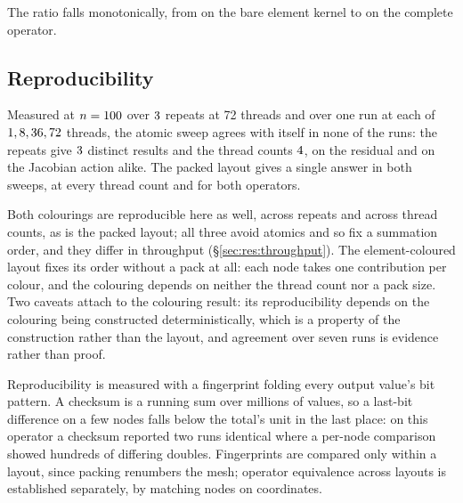 \documentclass[sigconf,nonacm]{acmart}
\newcommand{\fostag}{\emph{First-order upwind.}}
\newcommand{\provwarn}{\ifnum\campProvisional=1 \textbf{[PROVISIONAL: pipeline-validation data from \campHost, not this paper's campaign]} \fi}
\begin{document}
\begin{table}[t]
  \centering
  \caption{\provwarn \fostag{} Throughput as solver terms are added, residual at $n=\campN$, on
    the three matrix-free layouts. \emph{col.} uses element colouring with plain nodal
    additions; \emph{standard} uses atomic additions. Colouring also changes traversal
    and adds barriers, so the ratios compare implementations without isolating the
    cost of atomic updates. \texttt{f32}: the same driver with every field and kernel
    in single precision, measured in a separate allocation, so ratios are read within a group.}
  \label{tab:ladder}
  
\end{table}

The ratio falls monotonically, from \ladderBare{} on the bare element kernel to
\ladderFull{} on the complete operator.

\subsection{Reproducibility}
\label{sec:res:determinism}

Measured at $n=100$ over $3$ repeats at 72 threads and over one run at each of
$1, 8, 36, 72$ threads, the atomic sweep agrees with itself in none of the runs: the repeats give
$3$ distinct results and the thread counts $4$, on the residual and
on the Jacobian action alike. The packed layout gives a single answer in both sweeps, at every
thread count and for both operators.

Both colourings are reproducible here as well, across repeats and across thread counts, as is the
packed layout; all three avoid atomics and so fix a summation order, and they differ in
throughput (\S\ref{sec:res:throughput}). The element-coloured layout fixes its order without a
pack at all: each node takes one contribution per colour, and the colouring depends on neither
the thread count nor a pack size. Two caveats attach to
the colouring result: its reproducibility depends on the colouring being constructed
deterministically, which is a property of the construction rather than the layout, and agreement
over seven runs is evidence rather than proof.

Reproducibility is measured with a fingerprint folding every output value's bit pattern. A
checksum is a running sum over millions of values, so a last-bit difference on a few nodes falls
below the total's unit in the last place: on this operator a checksum reported two runs identical
where a per-node comparison showed hundreds of differing doubles. Fingerprints are compared only
within a layout, since packing renumbers the mesh; operator equivalence across layouts is
established separately, by matching nodes on coordinates.
\end{document}
